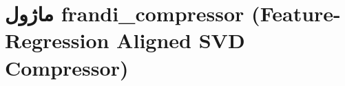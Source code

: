 \section{ماژول frandi\_compressor (Feature-Regression Aligned SVD Compressor)}
\label{sec:module_frandi_compressor}
